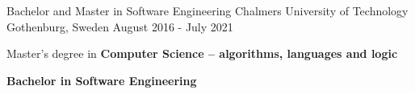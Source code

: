 
\begin{cventries}
  \cventry
    {Bachelor and Master in Software Engineering} %
    {Chalmers University of Technology} %
    {Gothenburg, Sweden} %
    {August 2016 - July 2021} %
    {
      \begin{cvitems} %
         \item { Master's degree in \textbf{ Computer Science – algorithms, languages and logic}}
         \vspace{0.5mm}
         \item {\textbf{Bachelor in Software Engineering}}
      \end{cvitems}
    }
\end{cventries}
